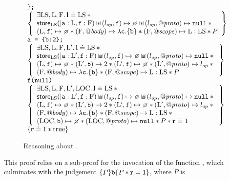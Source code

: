\documentclass{article}
\begin{document}
\begin{figure}
\[\begin{array}{l}
        \js{\};}\\
        \left\{\begin{array}{l}
                \exists\V{LS},\V{L},\V{F}\st\ls\doteq\V{LS} \sep {} \\
                \store_{\V{LS}}(|\js{a}:\V{L},\js{f}:\V{F})\sepish(\lop,\js{f})\pointsto\none \sepish (\lop,\protop)\pointsto\nil\sep {} \\
                (\V{L},\js{f})\pointsto\none \sep 
                (\V{F},\bodyp)\pointsto \lambda\js{c}.\{\js{b}\} \sep
                (\V{F},\fscopep)\pointsto \V{L}:\V{LS} \sep P
        \end{array}\right\}\\
        \js{a = \{b:2\};}\\
        \left\{\begin{array}{l}
                \exists\V{LS},\V{L},\V{F},\V{L}'\st\ls\doteq\V{LS} \sep {} \\
                \store_{\V{LS}}(|\js{a}:\V{L}',\js{f}:\V{F})\sepish(\lop,\js{f})\pointsto\none\sepish(\lop,\protop)\pointsto\nil \sep {}\\
                (\V{L},\js{f})\pointsto\none \sep 
                (\V{L}',\js{b})\pointsto 2 \sep (\V{L}',\js{f})\pointsto\none \sep (\V{L}',\protop)\pointsto\lop \sep {}\\
                (\V{F},\bodyp)\pointsto \lambda\js{c}.\{\js{b}\} \sep
                (\V{F},\fscopep)\pointsto \V{L}:\V{LS} \sep P
        \end{array}\right\}\\
        \js{f(null)}\\
        \left\{\begin{array}{l}
                \exists\V{LS},\V{L},\V{F},\V{L}',\V{LOC}\st\ls\doteq\V{LS} \sep {} \\
                \store_{\V{LS}}(|\js{a}:\V{L}',\js{f}:\V{F})\sepish(\lop,\js{f})\pointsto\none\sepish (\lop,\protop)\pointsto\nil \sep {}\\
                (\V{L},\js{f})\pointsto\none \sep 
                (\V{L}',\js{b})\pointsto 2 \sep (\V{L}',\js{f})\pointsto\none \sep (\V{L}',\protop)\pointsto\lop \sep {}\\
                (\V{F},\bodyp)\pointsto \lambda\js{c}.\{\js{b}\} \sep
                (\V{F},\fscopep)\pointsto \V{L}:\V{LS} \sep {} \\
                (\V{LOC},\js{b})\pointsto\none \sep (\V{LOC},\protop)\pointsto\nil \sep P \sep \rv\doteq 1
        \end{array}\right\}\\
        \{ \rv\doteq 1 \sep \true \}
\end{array}
\]
\caption{Reasoning about .}
\label{fig:withproof}
\end{figure}
This proof relies on a sub-proof for the invocation of the function , which culminates with the judgement $\{P\}\mbox{\texttt{{\upshape b}}}\{P\mathbin{*}{\mathrm{\textbf{r}}}\doteq 1\}$, where $P$ is 
\end{document}
